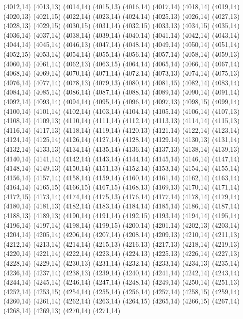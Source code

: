 (4012,14)
(4013,13)
(4014,14)
(4015,13)
(4016,14)
(4017,14)
(4018,14)
(4019,14)
(4020,13)
(4021,15)
(4022,14)
(4023,14)
(4024,14)
(4025,13)
(4026,14)
(4027,13)
(4028,13)
(4029,15)
(4030,15)
(4031,14)
(4032,15)
(4033,13)
(4034,15)
(4035,14)
(4036,14)
(4037,14)
(4038,14)
(4039,14)
(4040,14)
(4041,14)
(4042,14)
(4043,14)
(4044,14)
(4045,14)
(4046,13)
(4047,14)
(4048,14)
(4049,14)
(4050,14)
(4051,14)
(4052,15)
(4053,14)
(4054,14)
(4055,14)
(4056,14)
(4057,14)
(4058,14)
(4059,13)
(4060,14)
(4061,14)
(4062,13)
(4063,15)
(4064,14)
(4065,14)
(4066,14)
(4067,14)
(4068,14)
(4069,14)
(4070,14)
(4071,14)
(4072,14)
(4073,13)
(4074,14)
(4075,13)
(4076,14)
(4077,14)
(4078,13)
(4079,13)
(4080,14)
(4081,15)
(4082,14)
(4083,14)
(4084,14)
(4085,14)
(4086,14)
(4087,14)
(4088,14)
(4089,14)
(4090,14)
(4091,14)
(4092,14)
(4093,14)
(4094,14)
(4095,14)
(4096,14)
(4097,13)
(4098,15)
(4099,14)
(4100,14)
(4101,14)
(4102,14)
(4103,14)
(4104,14)
(4105,14)
(4106,14)
(4107,13)
(4108,14)
(4109,13)
(4110,14)
(4111,14)
(4112,14)
(4113,13)
(4114,14)
(4115,13)
(4116,14)
(4117,13)
(4118,14)
(4119,14)
(4120,13)
(4121,14)
(4122,14)
(4123,14)
(4124,14)
(4125,14)
(4126,14)
(4127,14)
(4128,14)
(4129,14)
(4130,13)
(4131,14)
(4132,14)
(4133,13)
(4134,14)
(4135,14)
(4136,14)
(4137,13)
(4138,14)
(4139,13)
(4140,14)
(4141,14)
(4142,14)
(4143,14)
(4144,14)
(4145,14)
(4146,14)
(4147,14)
(4148,14)
(4149,13)
(4150,14)
(4151,13)
(4152,14)
(4153,14)
(4154,14)
(4155,14)
(4156,14)
(4157,14)
(4158,14)
(4159,14)
(4160,14)
(4161,14)
(4162,14)
(4163,14)
(4164,14)
(4165,15)
(4166,15)
(4167,15)
(4168,13)
(4169,13)
(4170,14)
(4171,14)
(4172,15)
(4173,14)
(4174,14)
(4175,13)
(4176,14)
(4177,14)
(4178,14)
(4179,14)
(4180,14)
(4181,13)
(4182,14)
(4183,14)
(4184,14)
(4185,14)
(4186,14)
(4187,14)
(4188,13)
(4189,13)
(4190,14)
(4191,14)
(4192,15)
(4193,14)
(4194,14)
(4195,14)
(4196,14)
(4197,14)
(4198,14)
(4199,15)
(4200,14)
(4201,14)
(4202,13)
(4203,14)
(4204,14)
(4205,14)
(4206,14)
(4207,14)
(4208,14)
(4209,13)
(4210,14)
(4211,13)
(4212,14)
(4213,14)
(4214,14)
(4215,13)
(4216,13)
(4217,13)
(4218,14)
(4219,13)
(4220,14)
(4221,14)
(4222,14)
(4223,14)
(4224,13)
(4225,13)
(4226,14)
(4227,13)
(4228,14)
(4229,14)
(4230,13)
(4231,14)
(4232,14)
(4233,14)
(4234,13)
(4235,14)
(4236,14)
(4237,14)
(4238,13)
(4239,14)
(4240,14)
(4241,14)
(4242,14)
(4243,14)
(4244,14)
(4245,14)
(4246,14)
(4247,14)
(4248,14)
(4249,14)
(4250,14)
(4251,13)
(4252,14)
(4253,15)
(4254,14)
(4255,14)
(4256,14)
(4257,14)
(4258,15)
(4259,14)
(4260,14)
(4261,14)
(4262,14)
(4263,14)
(4264,15)
(4265,14)
(4266,15)
(4267,14)
(4268,14)
(4269,13)
(4270,14)
(4271,14)
